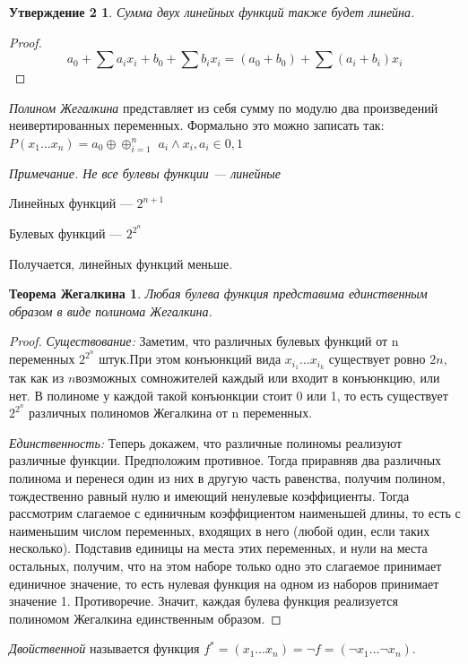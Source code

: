﻿\documentclass[a4paper, 12pt]{article}
\newtheorem*{n2}{Утверждение 2}
\newtheorem*{zhegalkin}{Теорема Жегалкина}
\begin{document}
\begin{n2}
Сумма двух линейных функций также будет линейна.
\end{n2}
\begin{proof}
\[a_0 + \sum a_ix_i + b_0 + \sum b_ix_i = (a_0 + b_0) + \sum (a_i + b_i)x_i\]
\end{proof}

\textit{Полином Жегалкина} представляет из себя сумму по модулю два произведений неивертированных переменных. Формально это можно записать так: $P(x_1 \ldots x_n) = a_0 \oplus${\Large $\oplus_{i = 1}^n$} $a_i \wedge x_i, a_i \in {0,1}$

\textit{Примечание. Не все булевы функции --- линейные}

Линейных функций --- $2^{n+1}$

Булевых функций --- $2^{2^n}$

Получается, линейных функций меньше.

\begin{zhegalkin}
Любая булева функция представима единственным образом в виде полинома Жегалкина.
\end{zhegalkin}
\begin{proof}
 \textit{Существование: }Заметим, что различных булевых функций от n переменных $2^{2^n}$ штук.При этом конъюнкций вида $x_{i_1}\ldots x_{i_k}$ существует ровно $2n$, так как из $n $возможных сомножителей каждый или входит в конъюнкцию, или нет. В полиноме у каждой такой конъюнкции стоит 0 или 1, то есть существует $2^{2^n}$ различных полиномов Жегалкина от n переменных. 
 
 \textit{Единственность: }Теперь докажем, что различные полиномы реализуют различные функции. Предположим противное. Тогда приравняв два различных полинома и перенеся один из них в другую часть равенства, получим полином, тождественно равный нулю и имеющий ненулевые коэффициенты. Тогда рассмотрим слагаемое с единичным коэффициентом наименьшей длины, то есть с наименьшим числом переменных, входящих в него (любой один, если таких несколько). Подставив единицы на места этих переменных, и нули на места остальных, получим, что на этом наборе только одно это слагаемое принимает единичное значение, то есть нулевая функция на одном из наборов принимает значение 1. Противоречие. Значит, каждая булева функция реализуется полиномом Жегалкина единственным образом.
 \end{proof}

\textit{Двойственной} называется функция $f^* = (x_1 \ldots x_n) = \lnot f = (\lnot x_1 \ldots \lnot x_n)$.
\end{document}

